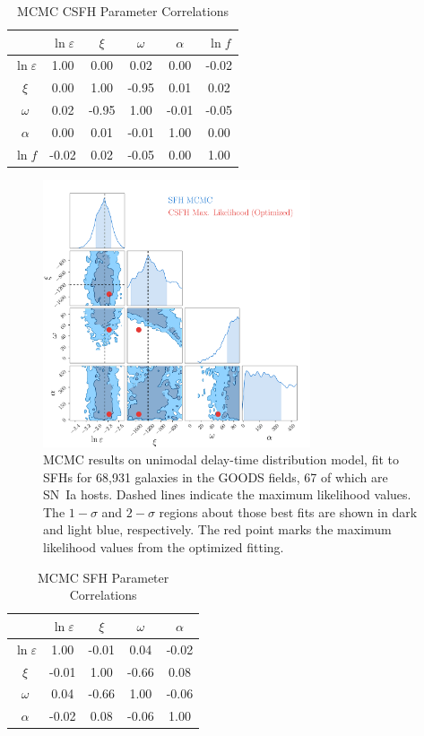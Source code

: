 \documentclass[apj, twocolumn]{aastex62}
\begin{document}
\begin{table}[h]
    \centering
    \caption{MCMC CSFH Parameter Correlations}
    \label{tab:parameter_correlations1}
    \begin{tabular}{c|ccccc}
         & $\ln\varepsilon$ & $\xi$ & $\omega$ & $\alpha$ & $\ln f$\\ 
        \hline
        $\ln\varepsilon$ &  1.00 &  0.00 &  0.02 &  0.00 & -0.02 \\ 
                   $\xi$ &  0.00 &  1.00 & -0.95 &  0.01 &  0.02 \\ 
                $\omega$ &  0.02 & -0.95 &  1.00 & -0.01 & -0.05 \\ 
                $\alpha$ &  0.00 &  0.01 & -0.01 &  1.00 &  0.00 \\ 
                 $\ln f$ & -0.02 &  0.02 & -0.05 &  0.00 &  1.00 \\ 
        \hline
    \end{tabular}
\end{table}

\begin{figure}[t] 
   \centering
   \includegraphics[width=3.1in]{figure_full_sfh_corners.pdf} 
   \caption{\footnotesize MCMC results on unimodal delay-time distribution model, fit to SFHs for 68,931 galaxies in the GOODS fields, 67 of which are SN~Ia hosts. Dashed lines indicate the maximum likelihood values. The $1-\sigma$ and $2-\sigma$ regions about those best fits are shown in dark and light blue, respectively. The red point marks the maximum likelihood values from the optimized fitting. }
   \label{fig:mcmc_sfh}
\end{figure}

\begin{table}[h]
    \centering
    \caption{MCMC SFH Parameter Correlations}
    \label{tab:parameter_correlations2}
    \begin{tabular}{c|cccc}
         & $\ln\varepsilon$ & $\xi$ & $\omega$ & $\alpha$\\ 
        \hline
        $\ln\varepsilon$ &  1.00 & -0.01 &  0.04 & -0.02 \\ 
                   $\xi$ & -0.01 &  1.00 & -0.66 &  0.08 \\ 
                $\omega$ &  0.04 & -0.66 &  1.00 & -0.06 \\ 
                $\alpha$ & -0.02 &  0.08 & -0.06 &  1.00 \\ 
        \hline
    \end{tabular}
\end{table}
\end{document}
